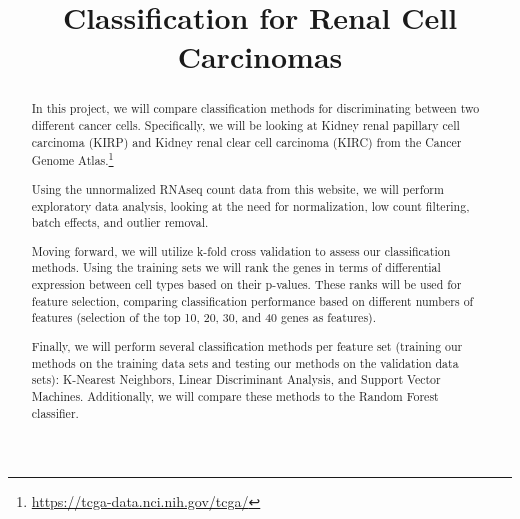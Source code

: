



\begin{frontmatter}

\title{Classification for Renal Cell Carcinomas}




\begin{abstract}

In this project, we will compare classification methods for discriminating between
two different cancer cells. Specifically, we will be looking at Kidney renal
papillary cell carcinoma (KIRP) and Kidney renal clear cell carcinoma (KIRC)
from the Cancer Genome Atlas.\footnote{\url{https://tcga-data.nci.nih.gov/tcga/}}

Using the unnormalized RNAseq count data from this website, we will perform exploratory
data analysis, looking at the need for normalization, low count filtering,
batch effects, and outlier removal.

Moving forward, we will utilize k-fold cross validation to assess
our classification methods. Using the training sets we will rank the
genes in terms of differential expression between cell types based on their p-values.
These ranks will be used for feature selection, comparing classification performance
based on different numbers of features (selection of the top 10, 20, 30, and 40 
genes as features).

Finally, we will perform several classification methods per feature set
(training our methods on the training data sets and testing our methods on the
validation data sets): K-Nearest Neighbors, Linear Discriminant Analysis, and
Support Vector Machines.  Additionally, we will compare these methods to the
Random Forest classifier.

 
\end{abstract}

\begin{keyword}
\end{keyword}

\end{frontmatter}



